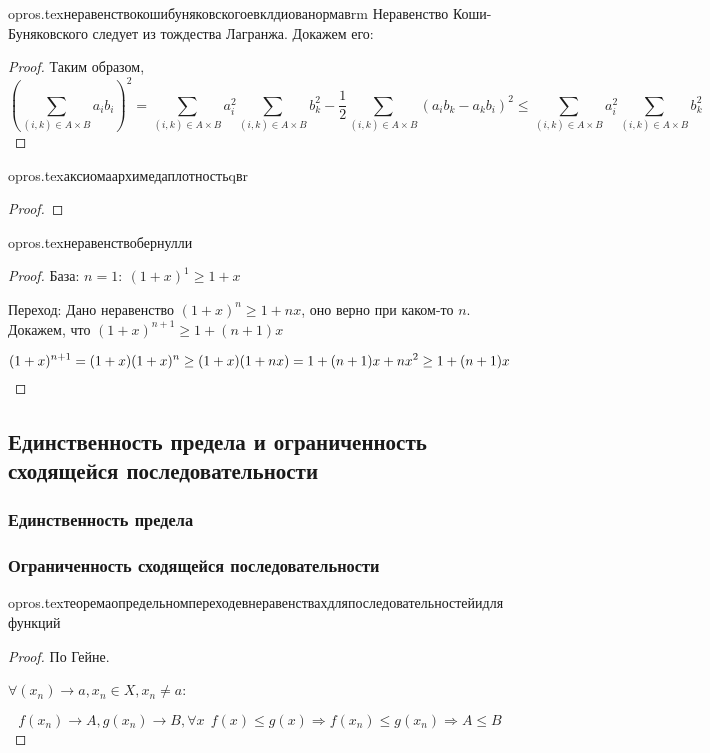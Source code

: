 {opros.tex}{неравенствокошибуняковскогоевклдиованормавrm}
Неравенство Коши-Буняковского следует из тождества Лагранжа. Докажем его:
\begin{proof}
    Таким образом, $$\left(\sum\limits_{(i,k)\in A\times B}a_ib_i\right)^2=\sum\limits_{(i,k)\in A\times B}a_i^2\sum\limits_{(i,k)\in A\times B}b_k^2 - \frac{1}{2}\sum\limits_{(i,k)\in A\times B}(a_ib_k-a_kb_i)^2 \leq \sum\limits_{(i,k)\in A\times B}a_i^2\sum\limits_{(i,k)\in A\times B}b_k^2$$
\end{proof}

{opros.tex}{аксиомаархимедаплотностьqвr}
\begin{proof}
\end{proof}

{opros.tex}{неравенствобернулли}
\begin{proof}
    База: $n=1: \ (1+x)^1\geq 1 + x$

    Переход: Дано неравенство $(1+x)^n\geq 1+nx$, оно верно при каком-то $n$. Докажем, что $(1+x)^{n+1}\geq 1 + (n+1)x$

    $$(1+x)^{n+1} = (1+x)(1+x)^n\geq (1+x)(1+nx) = \\ 1 + (n+1)x + nx^2 \geq 1 + (n+1)x$$
\end{proof}

\subsection{Единственность предела и ограниченность сходящейся последовательности}
\subsubsection{Единственность предела}
\subsubsection{Ограниченность сходящейся последовательности}

{opros.tex}{теоремаопредельномпереходевнеравенствахдляпоследовательностейидляфункций}
\begin{proof}
    По Гейне.

    $\forall (x_n)\to a, x_n\in X, x_n\not=a$:

    $$f(x_n)\to A, g(x_n)\to B, \forall x \ \ f(x) \leq g(x) \Rightarrow f(x_n)\leq g(x_n) \Rightarrow A\leq B$$
\end{proof}

